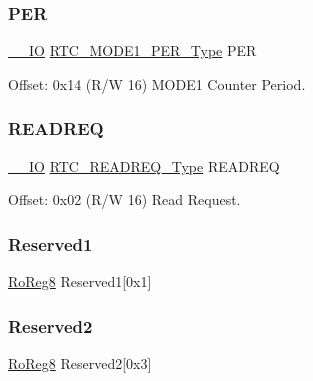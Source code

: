 \mbox{\label{struct_rtc_mode1_a1d92b9cf8b55f7293409f66fb6c251dc}} 
\subsubsection{\texorpdfstring{PER}{PER}}
{\footnotesize\ttfamily \mbox{\hyperlink{core__cm0plus_8h_aec43007d9998a0a0e01faede4133d6be}{\+\_\+\+\_\+\+IO}} \mbox{\hyperlink{union_r_t_c___m_o_d_e1___p_e_r___type}{R\+T\+C\+\_\+\+M\+O\+D\+E1\+\_\+\+P\+E\+R\+\_\+\+Type}} P\+ER}



Offset\+: 0x14 (R/W 16) M\+O\+D\+E1 Counter Period. 

\mbox{\label{struct_rtc_mode1_aa1779f0fc09662a56db255c1637c56c0}} 
\subsubsection{\texorpdfstring{READREQ}{READREQ}}
{\footnotesize\ttfamily \mbox{\hyperlink{core__cm0plus_8h_aec43007d9998a0a0e01faede4133d6be}{\+\_\+\+\_\+\+IO}} \mbox{\hyperlink{union_r_t_c___r_e_a_d_r_e_q___type}{R\+T\+C\+\_\+\+R\+E\+A\+D\+R\+E\+Q\+\_\+\+Type}} R\+E\+A\+D\+R\+EQ}



Offset\+: 0x02 (R/W 16) Read Request. 

\mbox{\label{struct_rtc_mode1_a092866123ac46d0985136e4dca2f36f4}} 
\subsubsection{\texorpdfstring{Reserved1}{Reserved1}}
{\footnotesize\ttfamily \mbox{\hyperlink{group___s_a_m_d21_e15_a__definitions_ga0d957f1433aaf5d70e4dc2b68288442d}{Ro\+Reg8}} Reserved1\mbox{[}0x1\mbox{]}}

\mbox{\label{struct_rtc_mode1_a3e3d4b7e35d84b272d434a1396e8b7be}} 
\subsubsection{\texorpdfstring{Reserved2}{Reserved2}}
{\footnotesize\ttfamily \mbox{\hyperlink{group___s_a_m_d21_e15_a__definitions_ga0d957f1433aaf5d70e4dc2b68288442d}{Ro\+Reg8}} Reserved2\mbox{[}0x3\mbox{]}}

